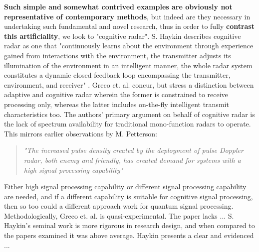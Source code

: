 \textbf{Such simple and somewhat contrived examples are obviously not representative of contemporary methods}, but indeed are they necessary in undertaking such fundamental and novel research, thus in order to fully \textbf{contrast this artificiality}, we look to "cognitive radar".
S. Haykin describes cognitive radar as one that "continuously learns about the environment through experience gained from interactions with the environment, the transmitter adjusts its illumination of the environment in an intelligent manner, the whole radar system constitutes a dynamic closed feedback loop encompassing the transmitter, environment, and receiver" \cite{haykin_cognitive_2006}.
Greco et. al. \cite{greco_cognitive_nodate} concur, but stress a distinction between adaptive and cognitive radar wherein the former is constrained to receive processing only, whereas the latter includes on-the-fly intelligent transmit characteristics too.
The authors' primary argument on behalf of cognitive radar is the lack of spectrum availability for traditional mono-function radars to operate.
This mirrors earlier observations by M. Petterson:
\begin{quote}
    \textit{"The increased pulse density created by the deployment of pulse Doppler radar, both enemy and friendly, has created demand for systems with a high signal processing capability"}  \cite{pettersson_illustrated_1992}%
\end{quote}
Either high signal processing capability or different signal processing capability are needed, and if a different capability is suitable for cognitive signal processing, then so too could a different approach work for quantum signal processing.
Methodologically, Greco et. al. is quasi-experimental. The paper lacks ...
S. Haykin's seminal work is more rigorous in research design, and when compared to the papers examined it was above average.
Haykin presents a clear and evidenced ...


